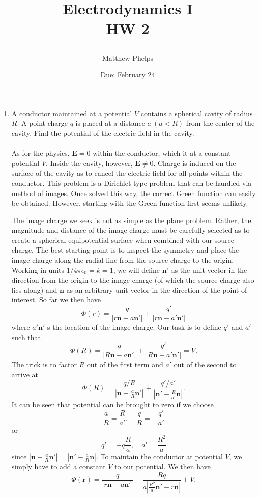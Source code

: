 \documentclass[11pt,letterpaper]{article}
\title{\begin{spacing}{1.2}Electrodynamics I\\HW 2\end{spacing}}
\author{Matthew Phelps}
\date{Due: February 24}
\newcommand{\vect}[1]{\mathbf{#1}}
\begin{document}
\maketitle

\begin{enumerate}
  \item A conductor maintained at a potential $V$ contains a spherical cavity of radius $R$. A point charge $q$ is placed at a distance $a\ (a<R)$ from the center of the cavity. Find the potential of the electric field in the cavity.
  \\ \\As for the physics, $\vect E = 0$ within the conductor, which it at a constant potential $V$. Inside the cavity, however, $\vect E\neq 0$. Charge is induced on the surface of the cavity as to cancel the electric field for all points within the conductor. This problem is a Dirichlet type problem that can be handled via method of images. Once solved this way, the correct Green function can easily be obtained. However, starting with the Green function first seems unlikely. 
  
 The image charge we seek is not as simple as the plane problem. Rather, the magnitude and distance of the image charge must be carefully selected as to create a spherical equipotential surface when combined with our source charge. The best starting point is to inspect the symmetry and  place the image charge along the radial line from the source charge to the origin. Working in units $1/4\pi\epsilon_0=k=1$, we will define $\vect n'$ as the unit vector in the direction from the origin to the image charge (of which the source charge also lies along) and $\vect n$ as an arbitrary unit vector in the direction of the point of interest. So far we then have 
 $$\Phi(r) =  \frac{q}{|r\vect n-a\vect n'|}+\frac{q'}{|r\vect n -a'\vect n'|}$$
 where $a'\vect n'$ s the location of the image charge. Our task is to define $q'$ and $a'$ such that
 $$\Phi(R) =  \frac{q}{|R\vect n-a\vect n'|}+\frac{q'}{|R\vect n -a'\vect n'|}=V.$$
The trick is to factor $R$ out of the first term and $a'$ out of the second to arrive at
 $$\Phi(R) =  \frac{q/R}{|\vect n-\frac{a}{R}\vect n'|}+\frac{q'/a'}{|\vect n' -\frac{R}{a'}\vect n|}.$$
It can be seen that potential can be brought to zero if we choose
 $$\frac{a}{R} = \frac{R}{a'},\quad \frac{q}{R}=-\frac{q'}{a'}$$
 or
 $$q' = -q\frac{R}{a},\quad a'=\frac{R^2}{a}$$
 since $|\vect n-\frac{a}{R}\vect n'| = |\vect n'-\frac{a}{R}\vect n|$.
To maintain the conductor at potential $V$, we simply have to add a constant $V$ to our potential. We then have
$$\Phi(\vect r) = \frac{q}{|r\vect n-a\vect n'|}-\frac{Rq}{a|\frac{R^2}{a}\vect n'-r\vect n|}+V.$$



\end{enumerate}
\end{document}
